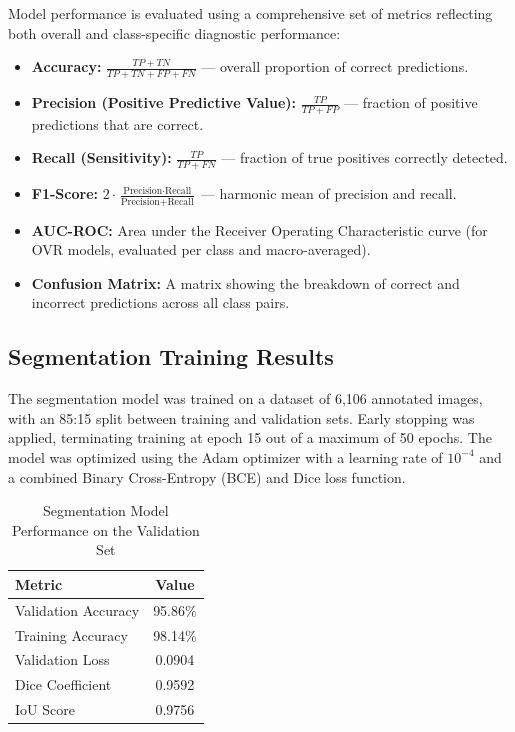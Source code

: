 Model performance is evaluated using a comprehensive set of metrics reflecting both overall and class-specific diagnostic performance:
\begin{itemize}
    \item \textbf{Accuracy:} $\frac{TP+TN}{TP+TN+FP+FN}$ --- overall proportion of correct predictions.
    \item \textbf{Precision (Positive Predictive Value):} $\frac{TP}{TP+FP}$ --- fraction of positive predictions that are correct.
    \item \textbf{Recall (Sensitivity):} $\frac{TP}{TP+FN}$ --- fraction of true positives correctly detected.
    \item \textbf{F1-Score:} $2 \cdot \frac{\text{Precision} \cdot \text{Recall}}{\text{Precision} + \text{Recall}}$ --- harmonic mean of precision and recall.
    \item \textbf{AUC-ROC:} Area under the Receiver Operating Characteristic curve (for OVR models, evaluated per class and macro-averaged).
    \item \textbf{Confusion Matrix:} A matrix showing the breakdown of correct and incorrect predictions across all class pairs.
\end{itemize}

\subsection{Segmentation Training Results}

The segmentation model was trained on a dataset of 6,106 annotated images, with an 85:15 split between training and validation sets. Early stopping was applied, terminating training at epoch 15 out of a maximum of 50 epochs. The model was optimized using the Adam optimizer with a learning rate of $10^{-4}$ and a combined Binary Cross-Entropy (BCE) and Dice loss function.

\begin{table}[h]
	\centering
	\caption{Segmentation Model Performance on the Validation Set}
	\label{tab:segmentation_results}
	\begin{tabular}{lc}
		\hline
		\textbf{Metric} & \textbf{Value} \\
		\hline
		Validation Accuracy & 95.86\% \\
		Training Accuracy & 98.14\% \\
		Validation Loss & 0.0904 \\
		Dice Coefficient & 0.9592 \\
		IoU Score & 0.9756 \\
		\hline
	\end{tabular}
\end{table}

